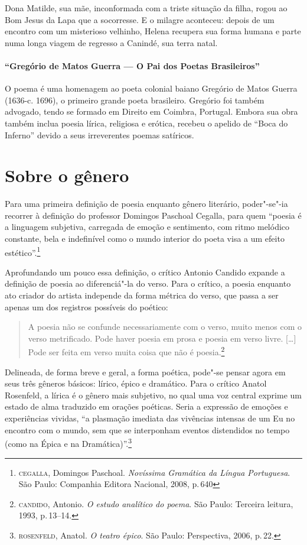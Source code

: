 Dona Matilde, sua mãe, inconformada com a triste situação da filha,
rogou ao Bom Jesus da Lapa que a socorresse. E o milagre aconteceu:
depois de um encontro com um misterioso velhinho, Helena recupera sua
forma humana e parte numa longa viagem de regresso a Canindé, sua terra
natal. 

\paragraph{“Gregório de Matos Guerra — O Pai dos Poetas Brasileiros”}

O poema é uma homenagem ao poeta colonial baiano Gregório de Matos
Guerra (1636-c. 1696), o primeiro grande poeta brasileiro. Gregório foi
também advogado, tendo se formado em Direito em Coimbra, Portugal.
Embora sua obra também inclua poesia lírica, religiosa e erótica,
recebeu o apelido de “Boca do Inferno” devido a seus irreverentes
poemas satíricos.

\section{Sobre o gênero} 

Para uma primeira definição de poesia enquanto gênero literário, poder"-se"-ia recorrer à definição do professor Domingos Paschoal Cegalla, para quem ``poesia é a linguagem subjetiva, carregada de emoção e sentimento, com ritmo melódico constante, bela e indefinível como o mundo interior do poeta visa a um efeito estético''.\footnote{\textsc{cegalla}, Domingos Paschoal. \textit{Novíssima Gramática da Língua Portuguesa}. São Paulo: Companhia Editora Nacional, 2008, p.\,640}

Aprofundando um pouco essa definição, o crítico Antonio Candido expande a definição de poesia ao diferenciá"-la do verso.
Para o crítico, a poesia enquanto ato criador do artista independe da forma métrica do verso, que passa a ser apenas um dos registros possíveis do poético:

\begin{quote}
A poesia não se confunde necessariamente com o verso, muito menos com o verso metrificado. Pode haver poesia em prosa e poesia em verso livre. [\ldots]
Pode ser feita em verso muita coisa que não é poesia.\footnote{\textsc{candido}, Antonio. \textit{O estudo analítico do poema}. São Paulo: Terceira leitura, 1993, p.\,13--14.}
\end{quote}

Delineada, de forma breve e geral, a forma poética, pode"-se pensar agora em seus três gêneros básicos: lírico, épico e dramático.
Para o crítico Anatol Rosenfeld, a lírica é o gênero mais subjetivo, no qual uma voz central exprime um estado de alma traduzido em orações poéticas.
Seria a expressão de emoções e experiências vividas, ``a plasmação imediata das vivências intensas de um Eu no encontro com o mundo, sem que se interponham eventos distendidos no tempo (como na Épica e na Dramática)''.\footnote{\textsc{rosenfeld}, Anatol. \textit{O teatro épico}. São Paulo: Perspectiva, 2006, p.\,22.}

